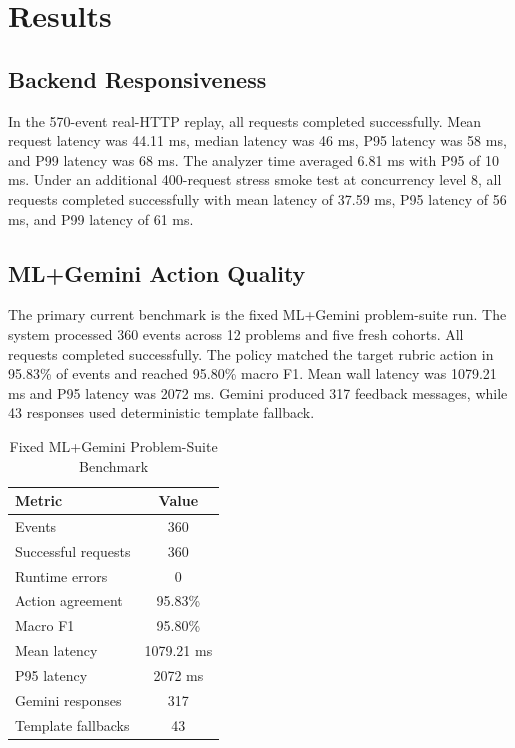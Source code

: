 \documentclass[conference]{IEEEtran}
\begin{document}
\section{Results}

\subsection{Backend Responsiveness}

In the 570-event real-HTTP replay, all requests completed successfully. Mean request latency was 44.11 ms, median latency was 46 ms, P95 latency was 58 ms, and P99 latency was 68 ms. The analyzer time averaged 6.81 ms with P95 of 10 ms. Under an additional 400-request stress smoke test at concurrency level 8, all requests completed successfully with mean latency of 37.59 ms, P95 latency of 56 ms, and P99 latency of 61 ms.

\subsection{ML+Gemini Action Quality}

The primary current benchmark is the fixed ML+Gemini problem-suite run. The system processed 360 events across 12 problems and five fresh cohorts. All requests completed successfully. The policy matched the target rubric action in 95.83\% of events and reached 95.80\% macro F1. Mean wall latency was 1079.21 ms and P95 latency was 2072 ms. Gemini produced 317 feedback messages, while 43 responses used deterministic template fallback.

\begin{table}[t]
\centering
\caption{Fixed ML+Gemini Problem-Suite Benchmark}
\label{tab:mlgemini}
\renewcommand{\arraystretch}{1.12}
\begin{tabular}{lc}
\toprule
\textbf{Metric} & \textbf{Value} \\
\midrule
Events & 360 \\
Successful requests & 360 \\
Runtime errors & 0 \\
Action agreement & 95.83\% \\
Macro F1 & 95.80\% \\
Mean latency & 1079.21 ms \\
P95 latency & 2072 ms \\
Gemini responses & 317 \\
Template fallbacks & 43 \\
\bottomrule
\end{tabular}
\end{table}
\end{document}
